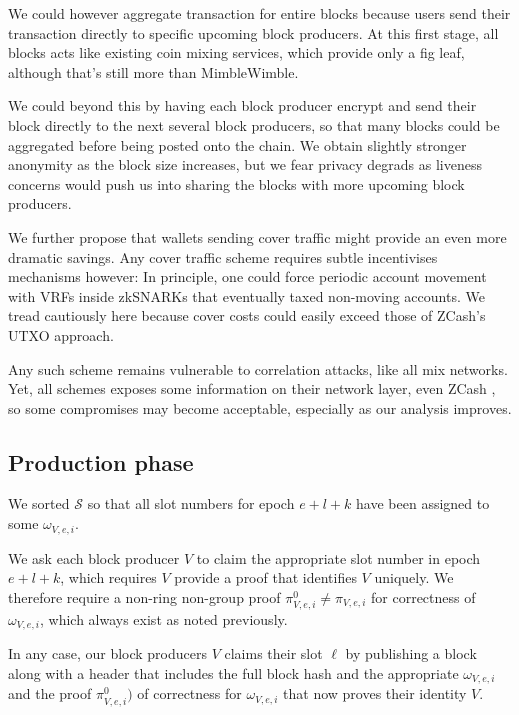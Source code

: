 We could however aggregate transaction for entire blocks because users send their transaction directly to specific upcoming block producers.  At this first stage, all blocks acts like existing coin mixing services, which provide only a fig leaf, although that's still more than MimbleWimble.  

We could beyond this by having each block producer encrypt and send their block directly to the next several block producers, so that many blocks could be aggregated before being posted onto the chain.  We obtain slightly stronger anonymity as the block size increases, but we fear privacy degrads as liveness concerns would push us into sharing the blocks with more upcoming block producers. 

We further propose that wallets sending cover traffic might provide an even more dramatic savings.  Any cover traffic scheme requires subtle incentivises mechanisms however:  In principle, one could force periodic account movement with VRFs inside zkSNARKs that eventually taxed non-moving accounts.  We tread cautiously here because cover costs could easily exceed those of ZCash's UTXO approach.

Any such scheme remains vulnerable to correlation attacks, like all mix networks.  Yet, all schemes exposes some information on their network layer, even ZCash \cite{ZCash_vulnerable_2019}, so some compromises may become acceptable, especially as our analysis improves.  

\subsection{Production phase}\label{subsec:production_phase}

We sorted $\mathcal{S}$ so that all slot numbers for epoch $e+l+k$ have been assigned to some $\omega_{V,e,i}$.  

We ask each block producer $V$ to claim the appropriate slot number in epoch $e+l+k$, which requires $V$ provide a proof that identifies $V$ uniquely.  
We therefore require a non-ring non-group proof $\pi^0_{V,e,i} \ne \pi_{V,e,i}$ for correctness of $\omega_{V,e,i}$, which always exist as noted previously.

In any case, our block producers $V$ claims their slot $\ell$ by publishing a block along with a header that includes the full block hash and the appropriate $\omega_{V,e,i}$ and the proof $\pi^0_{V,e,i})$ of correctness for $\omega_{V,e,i}$ that now proves their identity $V$.  

